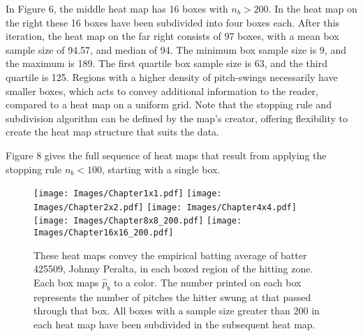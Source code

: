 In Figure 6, the middle heat map has 16 boxes with $n_{b} > 200$. In the heat map on the right these 16 boxes have been subdivided into four boxes each. After this iteration, the heat map on the far right consists of 97 boxes, with a mean box sample size of 94.57, and median of 94. The minimum box sample size is 9, and the maximum is 189. The first quartile box sample size is 63, and the third quartile is 125. Regions with a higher density of pitch-swings necessarily have smaller boxes, which acts to convey additional information to the reader, compared to a heat map on a uniform grid. Note that the stopping rule and subdivision algorithm can be defined by the map's creator, offering flexibility to create the heat map structure that suits the data. 

Figure 8 gives the full sequence of heat maps that result from applying the stopping rule $n_{b} < 100$, starting with a single box.
        \begin{figure}[H]
      	\centering
      	\texttt{[image: Images/Chapter1x1.pdf]}
      	\texttt{[image: Images/Chapter2x2.pdf]}
      	\texttt{[image: Images/Chapter4x4.pdf]}
      	\texttt{[image: Images/Chapter8x8\_200.pdf]} 
      	\texttt{[image: Images/Chapter16x16\_200.pdf]} 
      	\caption{These heat maps convey the empirical batting average of batter 425509, Johnny Peralta, in each boxed region of the hitting zone. Each box maps $\hat{p}_{b}$ to a color. The number printed on each box represents the number of pitches the hitter swung at that passed through that box. All boxes with a sample size greater than 200 in each heat map have been subdivided in the subsequent heat map.}
      	\end{figure}

